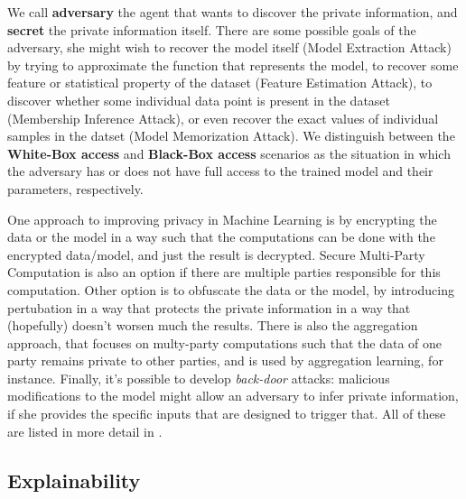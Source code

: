 We call \textbf{adversary} the agent that wants to discover the private information, and \textbf{secret} the private information itself. There are some possible goals of the adversary, she might wish to recover the model itself (Model Extraction Attack) by trying to approximate the function that represents the model, to recover some feature or statistical property of the dataset (Feature Estimation Attack), to discover whether some individual data point is present in the dataset (Membership Inference Attack), or even recover the exact values of individual samples in the datset (Model Memorization Attack). We distinguish between the \textbf{White-Box access} and \textbf{Black-Box access} scenarios as the situation in which the adversary has or does not have full access to the trained model and their parameters, respectively.

One approach to improving privacy in Machine Learning is by encrypting the data or the model in a way such that the computations can be done with the encrypted data/model, and just the result is decrypted. Secure Multi-Party Computation is also an option if there are multiple parties responsible for this computation. Other option is to obfuscate the data or the model, by introducing pertubation in a way that protects the private information in a way that (hopefully) doesn't worsen much the results. There is also the aggregation approach, that focuses on multy-party computations such that the data of one party remains private to other parties, and is used by aggregation learning, for instance. Finally, it's possible to develop \textit{back-door} attacks: malicious modifications to the model might allow an adversary to infer private information, if she provides the specific inputs that are designed to trigger that. All of these are listed in more detail in \cite{WMLMPASAO}.


\subsection{Explainability}

